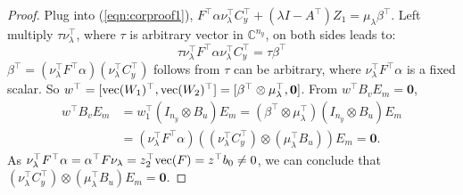 \begin{proof}
Plug into (\ref{eqn:corproof1}), \(F^\top \alpha \nu_\lambda^\top C_y^\top +  (\lambda I -A^\top) Z_1 = \mu_\lambda \beta^\top\).
Left multiply \(\tau \nu_\lambda^\top\), where \(\tau\) is arbitrary vector in \(\mathbb{C}^{n_y}\), on both sides leads to:
\begin{equation}
\tau \nu_\lambda^\top F^\top \alpha \nu_\lambda^\top C_y^\top = \tau \beta^\top
\end{equation}
\(\beta^\top =(\nu_\lambda^\top F^\top \alpha)(\nu_\lambda^\top C_y^\top)\) follows from  \(\tau\) can be arbitrary, where \(\nu_\lambda^\top F^\top \alpha\) is a fixed scalar. So \(w^\top = [{\mathrm{vec}}(W_1)^\top, {\mathrm{vec}}(W_2)^\top] = [\beta^\top \otimes \mu_\lambda^\top, \mathbf{0}]\). 
From \(w^\top B_v E_m=\mathbf{0}\),
\begin{equation*}
\begin{split}
     w^\top B_v E_m & = w_1^\top (I_{n_y} \otimes B_u)E_m = (\beta^\top \otimes \mu_\lambda^\top) (I_{n_y} \otimes B_u)E_m \\
     & = (\nu_\lambda^\top F^\top \alpha) ((\nu_\lambda^\top C_y^\top) \otimes (\mu_\lambda^\top B_u)) E_m = \mathbf{0}.
\end{split}
\end{equation*}
As \(\nu_\lambda^\top F^\top \alpha = \alpha^\top F \nu_\lambda = z_2^\top {\mathrm{vec}}(F) = z^\top b_0 \neq 0\), we can conclude that
\((\nu_\lambda^\top C_y^\top)\otimes(\mu_\lambda^\top B_u) E_m =\mathbf{0}.\)




\end{proof}
